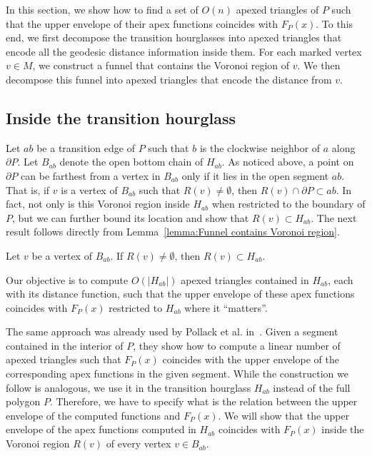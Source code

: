 \documentclass[a4paper,UKenglish]{lipics}
\newcommand{\F}[2]{\ensuremath{F_{\scriptscriptstyle #1}(#2)}}
\newcommand{\fn}[2]{\ensuremath{S_{\scriptscriptstyle #1}(#2)}}
\begin{document}
In this section, we show how to find a set of $O(n)$ apexed triangles of $P$ such that the upper envelope of their apex functions coincides with $\F{P}{x}$.
To this end, we first decompose the transition hourglasses into apexed triangles that encode all the geodesic distance information inside them. For each marked vertex $v\in M$, we construct a funnel that contains the Voronoi region of $v$.  We then decompose this funnel into apexed triangles that encode the distance from $v$.

\subsection{Inside the transition hourglass}
Let $ab$ be a transition edge of $P$  such that $b$ is the clockwise neighbor of $a$ along $\partial P$.
Let $B_{ab}$ denote the open bottom chain of $H_{ab}$.
As noticed above, a point on $\partial P$ can be farthest from a vertex in $B_{ab}$ only if it lies in the open segment $ab$.
That is, if $v$ is a vertex of $B_{ab}$ such that $R(v)\neq \emptyset$, then $R(v)\cap \partial P \subset ab$.
In fact, not only is this Voronoi region inside $H_{ab}$ when restricted to the boundary of $P$, but we can further bound its location and show that $R(v)\subset H_{ab}$. 
 The next result follows directly from Lemma~\ref{lemma:Funnel contains Voronoi region}.

\begin{corollary}\label{lemma:Cell contained in geodesic triangle}
Let $v$ be a vertex of $B_{ab}$. If $R(v)\neq \emptyset$, then $R(v) \subset H_{ab}$.
\end{corollary}


Our objective is to compute $O(|H_{ab}|)$ apexed triangles contained in $H_{ab}$, each with its distance function, such that the upper envelope of these apex functions coincides with $\F{P}{x}$ restricted to $H_{ab}$ where it ``matters''.

The same approach was already used by Pollack et al. in~\cite[Section 3]{pollackComputingCenter}. 
Given a segment contained in the interior of $P$, they show 
how to compute a linear number of apexed triangles such that $\F{P}{x}$ coincides with the upper envelope of the corresponding apex functions in the given segment.
While the construction we follow is analogous, we use it in the transition hourglass $H_{ab}$ instead of the full polygon $P$. 
Therefore, we have to specify what is the relation between the upper envelope of the computed functions and $\F{P}{x}$. 
We will show that the upper envelope of the apex functions computed in $H_{ab}$ coincides with $\F{P}{x}$ inside the Voronoi region $R(v)$ of every vertex $v\in B_{ab}$.
\end{document}
